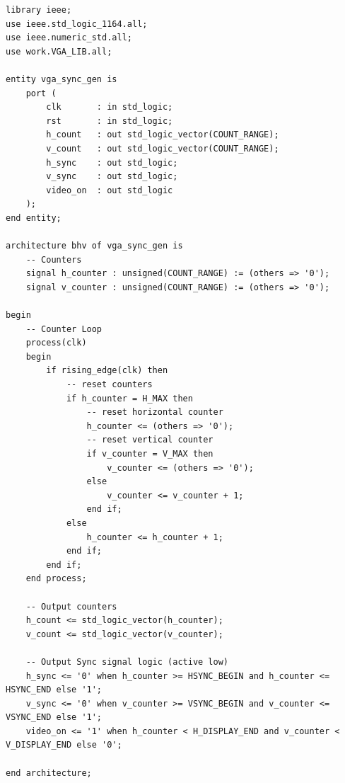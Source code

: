 \documentclass{article}
\begin{document}
\begin{lstlisting}[caption=VGA Sync Generator for Part 2, label=lst:vga-sync-gen-part-2]
library ieee;
use ieee.std_logic_1164.all;
use ieee.numeric_std.all;
use work.VGA_LIB.all;

entity vga_sync_gen is
    port (
        clk       : in std_logic;
        rst       : in std_logic;
        h_count   : out std_logic_vector(COUNT_RANGE);
        v_count   : out std_logic_vector(COUNT_RANGE);
        h_sync    : out std_logic;
        v_sync    : out std_logic;
        video_on  : out std_logic
    );
end entity;

architecture bhv of vga_sync_gen is
    -- Counters
    signal h_counter : unsigned(COUNT_RANGE) := (others => '0');
    signal v_counter : unsigned(COUNT_RANGE) := (others => '0');

begin
    -- Counter Loop
    process(clk)
    begin
        if rising_edge(clk) then
            -- reset counters
            if h_counter = H_MAX then
                -- reset horizontal counter
                h_counter <= (others => '0');
                -- reset vertical counter
                if v_counter = V_MAX then
                    v_counter <= (others => '0');
                else
                    v_counter <= v_counter + 1;
                end if;
            else
                h_counter <= h_counter + 1;
            end if;
        end if;
    end process;
    
    -- Output counters
    h_count <= std_logic_vector(h_counter);
    v_count <= std_logic_vector(v_counter);

    -- Output Sync signal logic (active low)
    h_sync <= '0' when h_counter >= HSYNC_BEGIN and h_counter <= HSYNC_END else '1';
    v_sync <= '0' when v_counter >= VSYNC_BEGIN and v_counter <= VSYNC_END else '1';
    video_on <= '1' when h_counter < H_DISPLAY_END and v_counter < V_DISPLAY_END else '0';

end architecture;
\end{lstlisting}
\end{document}
